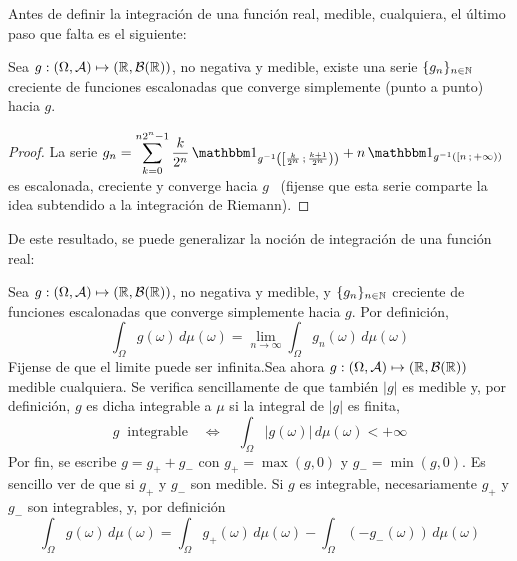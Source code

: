 Antes de definir la integraci\'on de una funci\'on real, medible, cualquiera, el
\'ultimo paso que falta es el siguiente:
%
\begin{teorema}
  Sea $g: (\Omega,\mathcal{A}) \mapsto  (\mathbb{R},\mathcal{B}(\mathbb{R}))$, no negativa y medible, existe
  una serie  $\{ g_n  \}_{n \in \mathbb{N}}$  creciente de funciones  escalonadas que
  converge simplemente (punto a punto) hacia $g$.
\end{teorema}
%
\begin{proof}
  La  serie   $\displaystyle  g_n   =  \sum_{k=0}^{n  2^n-1}   \frac{k}{2^n}  \,
  \un_{g^{-1}\left(  \left[  \frac{k}{2^n}   \,  ;  \,  \frac{k+1}{2^n}  \right)
    \right)} + n \, \un_{g^{-1}\left( \left[ n \, ; \, +\infty \right) \right)}$
  es  escalonada, creciente  y  converge hacia  $g$  \ (fijense  que esta  serie
  comparte la idea subtendido a la integraci\'on de Riemann).
\end{proof}

De  este resultado, se  puede generalizar  la noci\'on  de integraci\'on  de una
funci\'on real:
%
\begin{definicion}
  Sea $g: (\Omega,\mathcal{A})  \mapsto (\mathbb{R},\mathcal{B}(\mathbb{R}))$, no negativa y  medible, y $\{
  g_n  \}_{n  \in  \mathbb{N}}$  creciente  de  funciones  escalonadas  que  converge
  simplemente hacia $g$. Por definici\'on,
  \[
  \int_{\Omega}  g(\omega) \,  d\mu(\omega)  = \lim_{n  \to \infty}  \int_\Omega
  g_n(\omega) \, d\mu(\omega)
  \]
  Fijense de que el limite puede ser infinita.\newline Sea ahora $g: (\Omega,\mathcal{A})
  \mapsto  (\mathbb{R},\mathcal{B}(\mathbb{R}))$ medible cualquiera.  Se verifica  sencillamente de
  que tambi\'en $|g|$ es medible y,  por definici\'on, $g$ es dicha integrable a
  $\mu$ si la integral de $|g|$ es finita,
  \[
  g\: \mbox{ integrable} \quad  \Leftrightarrow \quad \int_\Omega |g(\omega)| \,
  d\mu(\omega) < +\infty
  \]
  Por  fin,  se escribe  $g  =  g_+  + g_-$  con  $g_+  =  \max(g,0)$ y  $g_-  =
  \min(g,0)$. Es  sencillo ver de que  si $g_+$ y  $g_-$ son medible. Si  $g$ es
  integrable, necesariamente $g_+$ y $g_-$ son integrables, y, por definici\'on
  \[
  \int_\Omega   g(\omega)   \,  d\mu(\omega)   =   \int_\Omega  g_+(\omega)   \,
  d\mu(\omega) - \int_\Omega \left( - g_-(\omega) \right) \, d\mu(\omega)
  \]
\end{definicion}

\

